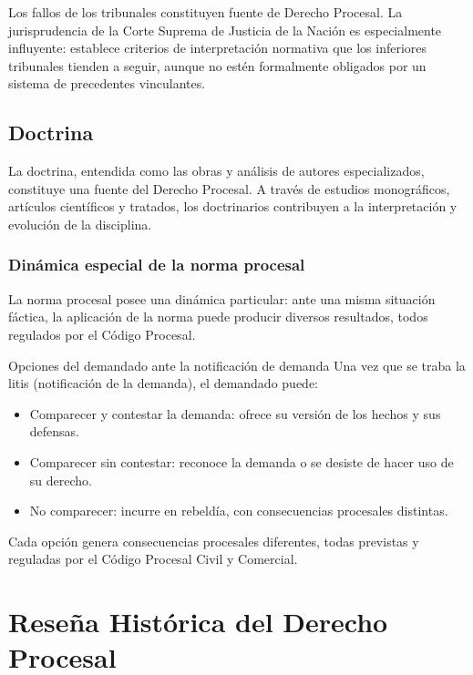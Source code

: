 \documentclass[12pt,oneside]{book}
\begin{document}
Los fallos de los tribunales constituyen fuente de Derecho Procesal. La jurisprudencia de la Corte Suprema de Justicia de la Nación es especialmente influyente: establece criterios de interpretación normativa que los inferiores tribunales tienden a seguir, aunque no estén formalmente obligados por un sistema de precedentes vinculantes.

\section{Doctrina}

La doctrina, entendida como las obras y análisis de autores especializados, constituye una fuente del Derecho Procesal. A través de estudios monográficos, artículos científicos y tratados, los doctrinarios contribuyen a la interpretación y evolución de la disciplina.

\subsection{Dinámica especial de la norma procesal}

La norma procesal posee una dinámica particular: ante una misma situación fáctica, la aplicación de la norma puede producir diversos resultados, todos regulados por el Código Procesal.

\begin{example}{Opciones del demandado ante la notificación de demanda}
Una vez que se traba la litis (notificación de la demanda), el demandado puede:
\begin{itemize}
    \item Comparecer y contestar la demanda: ofrece su versión de los hechos y sus defensas.
    \item Comparecer sin contestar: reconoce la demanda o se desiste de hacer uso de su derecho.
    \item No comparecer: incurre en rebeldía, con consecuencias procesales distintas.
\end{itemize}
Cada opción genera consecuencias procesales diferentes, todas previstas y reguladas por el Código Procesal Civil y Comercial.
\end{example}


\chapter{Reseña Histórica del Derecho Procesal}
\end{document}
